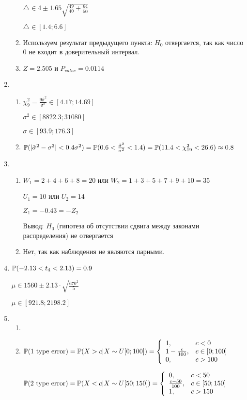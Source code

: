 \begin{enumerate}
\begin{enumerate}
$\triangle \in 4 \pm 1.65\sqrt{\frac{49}{40}+\frac{64}{50}}$

$\triangle \in [1.4;6.6]$
\item Используем результат предыдущего пункта: $H_{0}$ отвергается, так как число 0 не входит в доверительный интервал.
\item $Z=2.505$ и $P_{value}=0.0114$
\end{enumerate}
\item
\begin{enumerate}
\item $\chi_{9}^{2}=\frac{9\hat{\sigma}^{2}}{\sigma^{2}} \in [4.17; 14.69]$

$\sigma^{2} \in [8822.3; 31080]$

$\sigma \in [93.9; 176.3] $
\item  $\P(|\hat{\sigma}^{2}-\sigma^{2}|<0.4\sigma^{2})=\P(0.6<\frac{\hat{\sigma}^{2}}{\sigma^{2}}<1.4)=\P(11.4<\chi_{19}^{2}<26.6)\approx 0.8$
\end{enumerate}
\item
\begin{enumerate}
\item $W_{1}=2+4+6+8=20$ или $W_{2}=1+3+5+7+9+10=35$

$U_{1}=10$ или $U_{2}=14$

$Z_{1}=-0.43=-Z_{2}$

Вывод: $H_{0}$ (гипотеза об отсутствии сдвига между законами распределения) не отвергается
\item Нет, так как наблюдения не являются парными.
\end{enumerate}
\item  $\P(-2.13<t_{4}<2.13)=0.9$

$\mu \in 1560 \pm 2.13\cdot \sqrt{\frac{670^{2}}{5}}$

$\mu \in [921.8;2198.2]$
\item
\begin{enumerate}
\item
\item  $\P(\text{1 type error})=\P(X>c|X\sim U[0;100])= \left\{
\begin{array}{ll}
  1, & c<0 \\
  1-\frac{c}{100}, & c \in [0;100] \\
  0, & c>100 \\
\end{array}
\right.$

$\P(\text{2 type error})=\P(X<c|X\sim U[50;150])= \left\{
\begin{array}{ll}
  0, & c<50 \\
  \frac{c-50}{100}, & c \in [50;150] \\
  1, & c>150 \\
\end{array}
\right.$


\end{enumerate}
\end{enumerate}
